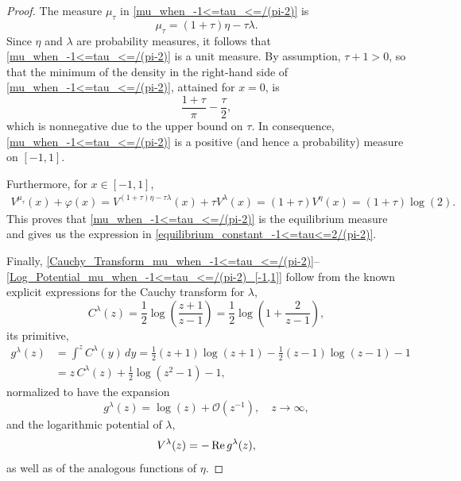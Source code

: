 \documentclass[reqno,11pt]{amsart}
\theoremstyle{plain}
\theoremstyle{definition}
\theoremstyle{remark}
\numberwithin{equation}{section}
\renewcommand{\Re}{\mathop{\rm Re}}
\begin{document}
\begin{proof}
    The measure $\mu_\tau$ in \eqref{mu_when_-1<=tau_<=/(pi-2)} is \begin{equation*}\label{Form_of_mu_when_-1<=tau_<=/(pi-2)}
        \mu_\tau=(1+\tau)\eta-\tau\lambda.
    \end{equation*}
    Since $\eta$ and $\lambda$ are probability measures, it follows that \eqref{mu_when_-1<=tau_<=/(pi-2)} is a unit measure. By assumption, $\tau+1>0$, so that the minimum of the density in the right-hand side of \eqref{mu_when_-1<=tau_<=/(pi-2)}, attained for $x=0$, is
    $$
   \frac{1+\tau}{\pi }-\frac{\tau}{2},
    $$
    which is nonnegative due to the upper bound on $\tau$. In consequence, \eqref{mu_when_-1<=tau_<=/(pi-2)} is a positive (and hence a probability) measure on $[-1,1]$.

    Furthermore, for $x\in[-1,1]$,  
    \begin{align*}
      V^{\mu_\tau}(x)+\varphi(x)=   V^{(1+\tau)\eta-\tau\lambda}(x)+\tau V^{\lambda}(x)=(1+\tau)V^\eta(x)=(1+\tau)\log(2).
    \end{align*}
    This proves that \eqref{mu_when_-1<=tau_<=/(pi-2)} is the equilibrium measure and gives us the expression in \eqref{equilibrium_constant_-1<=tau<=2/(pi-2)}. 
    
    Finally, \eqref{Cauchy_Transform_mu_when_-1<=tau_<=/(pi-2)}--\eqref{Log_Potential_mu_when_-1<=tau_<=/(pi-2)_[-1,1]} follow from the known explicit expressions for the Cauchy transform for $\lambda$,
    \begin{equation*} \label{CauchyforLebesgue}
        C^{\lambda}(z)= \frac{1}{2}\log\left(\frac{z+1}{z-1}\right)=\frac{1}{2}\log\left(1+\frac{2}{z-1}\right),
    \end{equation*}
    its primitive,
    \begin{equation} \label{GforLebesgue}
    \begin{split}
        g^{\lambda}(z)&=\int^z C^{\lambda}(y)\, dy= \frac{1}{2} (z+1) \log (z+1)-\frac{1}{2} (z-1) \log (z-1)-1 \\
        &= z \, C^{\lambda}(z)+\frac{1}{2}  \log (z^2-1) -1,
         \end{split}
    \end{equation}
    normalized to have the expansion
    $$
    g^{\lambda}(z)=\log(z)+\mathcal O(z^{-1}), \quad z\to\infty, 
    $$
    and the logarithmic potential of $\lambda$,
    $$
    V^{\lambda}(z)=-\Re g^{\lambda}(z),
    $$
    as well as of the analogous functions of $\eta$.
\end{proof}
\end{document}

